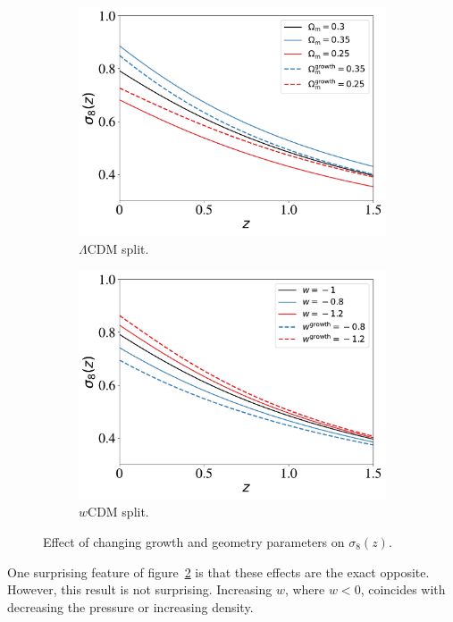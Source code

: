 \begin{figure}[ht]
	\centering
	\begin{subfigure}[b]{0.49\textwidth}
		\includegraphics[width=\textwidth]{plots/sigma8.pdf}
		\caption{$\Lambda$CDM split.}
		\label{fig:sigma8_l}
	\end{subfigure}
	\begin{subfigure}[b]{0.49\textwidth}
		\includegraphics[width=\textwidth]{plots/sigma8_w.pdf}
		\caption{$w$CDM split.}
		\label{fig:sigma8_w}
	\end{subfigure}
	\label{fig:sigma8}
	\caption{Effect of changing growth and geometry parameters on $\sigma_8(z)$.}
\end{figure}
One surprising feature of figure~\ref{fig:sigma8_w} is that these effects are the exact opposite. However, this result is not surprising. Increasing $w$, where $w<0$, coincides with decreasing the pressure or increasing density.
